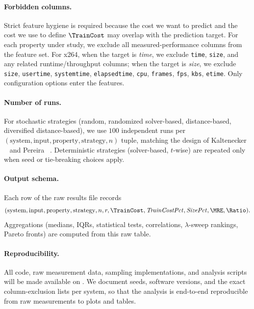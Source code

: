 \paragraph*{Forbidden columns.}
Strict feature hygiene is required because the cost we want to predict and the
cost we use to define $\TrainCost$ may overlap with the prediction target. For
each property under study, we exclude all measured-performance columns from
the feature set. For x264, when the target is \emph{time}, we exclude
\texttt{time}, \texttt{size}, and any related runtime/throughput columns; when
the target is \emph{size}, we exclude \texttt{size}, \texttt{usertime},
\texttt{systemtime}, \texttt{elapsedtime}, \texttt{cpu}, \texttt{frames},
\texttt{fps}, \texttt{kbs}, \texttt{etime}. Only configuration options enter
the features.

\paragraph*{Number of runs.}
For stochastic strategies (random, randomized solver-based, distance-based,
diversified distance-based), we use $100$ independent runs per
$(\text{system},\text{input},\text{property},\text{strategy},n)$ tuple,
matching the design of Kaltenecker \etal~\cite{kaltenecker2019} and
Pereira \etal~\cite{pereira2020}. Deterministic strategies (solver-based,
$t$-wise) are repeated only when seed or tie-breaking choices apply.

\paragraph*{Output schema.}
Each row of the raw results file records
\[
(\text{system},\text{input},\text{property},\text{strategy},n,r,
\TrainCost,\mathit{TrainCostPct},\mathit{SizePct},\MRE,\Ratio).
\]
Aggregations (medians, IQRs, statistical tests, correlations, $\lambda$-sweep
rankings, Pareto fronts) are computed from this raw table.

\paragraph*{Reproducibility.}
All code, raw measurement data, sampling implementations, and analysis
scripts will be made available on . We document seeds,
software versions, and the exact column-exclusion lists per system, so that
the analysis is end-to-end reproducible from raw measurements to plots and
tables.
